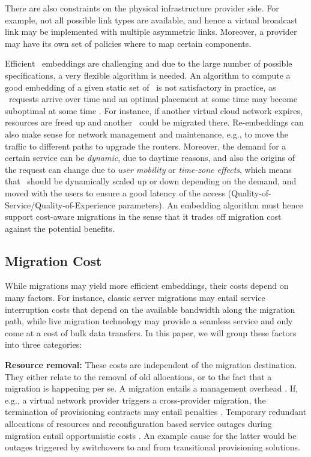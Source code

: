 \documentclass[conference,10pt]{IEEEtran}
\newcommand{\CloudNet}{\text{CloudNet}}
\newcommand{\CloudNets}{\text{CloudNets}}
\begin{document}
There are also constraints on the physical infrastructure provider
side. For example, not all possible link types are available, and
hence a virtual broadcast link may be implemented with multiple
asymmetric links. Moreover, a provider may have its own set of
policies where to map certain components.

Efficient \CloudNet\ embeddings are challenging and due to the large
number of possible specifications, a very flexible algorithm is
needed.
An algorithm to compute a good embedding of a given static set of
\CloudNets\ is not satisfactory in practice, as \CloudNet\ requests
arrive over time and an optimal placement at some time  may
become suboptimal at some time . For instance, if another
virtual cloud network expires, resources are freed up and another
\CloudNet\ could be migrated there. Re-embeddings can also make
sense for network management and maintenance, e.g., to move the
traffic to different paths to upgrade the routers. Moreover, the
demand for a certain service can be \emph{dynamic}, due to daytime
reasons, and also the origins of the request can change due to
\emph{user mobility} or \emph{time-zone effects}, which means that
\CloudNets\ should be dynamically scaled up or down depending on the
demand, and moved with the users to ensure a good latency of the
access (Quality-of-Service/Quality-of-Experience parameters). An
embedding algorithm must hence support cost-aware migrations in the
sense that it trades off migration cost against the potential
benefits.


\subsection{Migration Cost}\label{sec:map:cost}

While migrations may yield more efficient embeddings, their costs depend on many factors. For instance, classic server migrations may entail service interruption costs that depend on the available bandwidth along the migration path, while live migration technology may provide a seamless service and only come at a cost of bulk data transfers. In this paper, we will group these factors into three categories:

\noindent\textbf{Resource removal:} These costs are independent of the migration destination. They either relate to the removal of old allocations, or to the fact that a migration is happening per se. A migration entails a management overhead . If, e.g., a virtual network provider triggers a cross-provider migration, the termination of provisioning contracts may entail penalties .
		Temporary redundant allocations of resources and reconfiguration based service outages during migration entail opportunistic costs .
		An example cause for the latter would be outages triggered by switchovers to and from transitional provisioning solutions.
\end{document}
